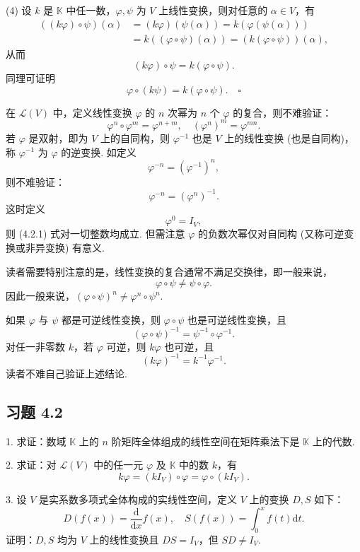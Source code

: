 \documentclass[UTF8, 12pt, fontset=fandol, oneside]{ctexart}
\begin{document}
(4) 设 $k$ 是 $\mathbb{K}$ 中任一数，$\varphi,\psi$ 为 $V$ 上线性变换，则对任意的 $\alpha\in V$，有
\[
\begin{aligned}
((k\varphi)\circ\psi)(\alpha)
&=(k\varphi)(\psi(\alpha))=k(\varphi(\psi(\alpha)))\\
&=k((\varphi\circ\psi)(\alpha))=(k(\varphi\circ\psi))(\alpha),
\end{aligned}
\]
从而
\[
(k\varphi)\circ\psi=k(\varphi\circ\psi).
\]
同理可证明
\[
\varphi\circ(k\psi)=k(\varphi\circ\psi). \quad \square
\]

在 $\mathcal{L}(V)$ 中，定义线性变换 $\varphi$ 的 $n$ 次幂为 $n$ 个 $\varphi$ 的复合，则不难验证：
\begin{equation}
\varphi^n\circ\varphi^m=\varphi^{n+m},\quad (\varphi^n)^m=\varphi^{mn}.
\tag{4.2.1}
\end{equation}
若 $\varphi$ 是双射，即为 $V$ 上的自同构，则 $\varphi^{-1}$ 也是 $V$ 上的线性变换 (也是自同构)，称 $\varphi^{-1}$ 为 $\varphi$ 的逆变换. 如定义
\[
\varphi^{-n}=(\varphi^{-1})^n,
\]
则不难验证：
\begin{equation}
\varphi^{-n}=(\varphi^n)^{-1}.
\tag{4.2.2}
\end{equation}
这时定义
\[
\varphi^0=I_V,
\]
则 (4.2.1) 式对一切整数均成立. 但需注意 $\varphi$ 的负数次幂仅对自同构 (又称可逆变换或非异变换) 有意义.

读者需要特别注意的是，线性变换的复合通常不满足交换律，即一般来说，
\[
\varphi\circ\psi\neq\psi\circ\varphi.
\]
因此一般来说，$(\varphi\circ\psi)^n\neq\varphi^n\circ\psi^n$.

如果 $\varphi$ 与 $\psi$ 都是可逆线性变换，则 $\varphi\circ\psi$ 也是可逆线性变换，且
\[
(\varphi\circ\psi)^{-1}=\psi^{-1}\circ\varphi^{-1}.
\]
对任一非零数 $k$，若 $\varphi$ 可逆，则 $k\varphi$ 也可逆，且
\[
(k\varphi)^{-1}=k^{-1}\varphi^{-1}.
\]
读者不难自己验证上述结论.

\subsection*{习题 4.2}

1. 求证：数域 $\mathbb{K}$ 上的 $n$ 阶矩阵全体组成的线性空间在矩阵乘法下是 $\mathbb{K}$ 上的代数.

2. 求证：对 $\mathcal{L}(V)$ 中的任一元 $\varphi$ 及 $\mathbb{K}$ 中的数 $k$，有
\[
k\varphi=(kI_V)\circ\varphi=\varphi\circ(kI_V).
\]

3. 设 $V$ 是实系数多项式全体构成的实线性空间，定义 $V$ 上的变换 $D,S$ 如下：
\[
D(f(x))=\frac{\mathrm{d}}{\mathrm{d}x}f(x),\quad S(f(x))=\int_0^x f(t)\mathrm{d}t.
\]
证明：$D,S$ 均为 $V$ 上的线性变换且 $DS=I_V$，但 $SD\neq I_V$.
\end{document}
